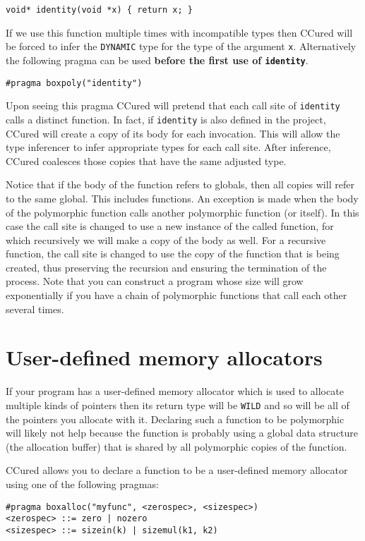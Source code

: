 \documentclass{book}
\def\t#1{{\tt #1}}
\begin{document}
\begin{verbatim}
void* identity(void *x) { return x; }
\end{verbatim}

 If we use this function multiple times with incompatible types then CCured
will be forced to infer the \t{DYNAMIC} type for the type of the argument
\t{x}. Alternatively the following pragma can be used {\bf before the first
use of \t{identity}}. 

\begin{verbatim}
#pragma boxpoly("identity")
\end{verbatim}
 
 Upon seeing this pragma CCured will pretend that each call site of
\t{identity} calls a distinct function. In fact, if \t{identity} is also
defined in the project, CCured will create a copy of its body for each
invocation. This will allow the type inferencer to infer appropriate types for
each call site. After inference, CCured coalesces those copies that have the
same adjusted type.

 Notice that if the body of the function refers to globals, then all copies
will refer to the same global. This includes functions. An exception is made
when the body of the polymorphic function calls another polymorphic function
(or itself). In this case the call site is changed to use a new instance of
the called function, for which recursively we will make a copy of the body as
well. For a recursive function, the call site is changed to use the copy of
the function that is being created, thus preserving the recursion and ensuring
the termination of the process. Note that you can construct a program whose
size will grow exponentially if you have a chain of polymorphic functions that
call each other several times. 

  \section{User-defined memory allocators}\label{sec-malloc}

 If your program has a user-defined memory allocator which is used to allocate
multiple kinds of pointers then its return type will be \t{WILD} and so will
be all of the pointers you allocate with it. Declaring such a function to be
polymorphic will likely not help because the function is probably using a
global data structure (the allocation buffer) that is shared by all
polymorphic copies of the function. 

 CCured allows you to declare a function to be a user-defined memory allocator
using one of the following pragmas:
\begin{verbatim}
#pragma boxalloc("myfunc", <zerospec>, <sizespec>)
<zerospec> ::= zero | nozero
<sizespec> ::= sizein(k) | sizemul(k1, k2)
\end{verbatim}
\end{document}
